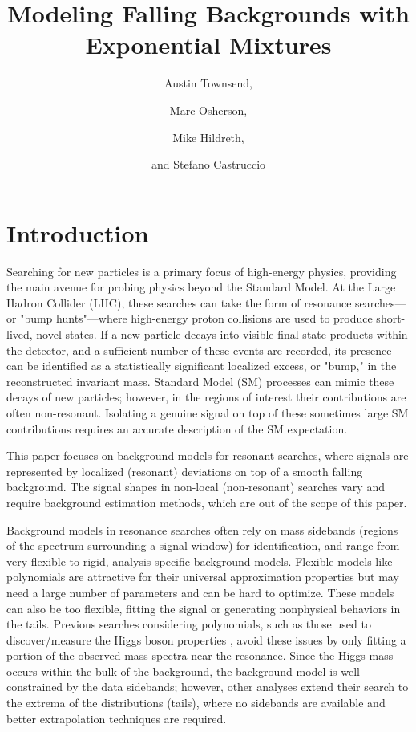 \documentclass[a4paper,11pt]{article}
\title{Modeling Falling Backgrounds with Exponential Mixtures}
\author[1]{Austin Townsend,}
\author[1]{Marc Osherson,}
\author[1]{Mike Hildreth, }
\author[1]{and Stefano Castruccio}
\affiliation[1]{University of Notre Dame,\\
USA}
\begin{document}
\maketitle
\flushbottom

\section{Introduction}
\label{sec:intro}

Searching for new particles is a primary focus of high-energy physics, providing the main avenue for probing physics beyond the Standard Model. At the Large Hadron Collider (LHC), these searches can take the form of resonance searches—or "bump hunts"—where high-energy proton collisions are used to produce short-lived, novel states. If a new particle decays into visible final-state products within the detector, and a sufficient number of these events are recorded, its presence can be identified as a statistically significant localized excess, or "bump," in the reconstructed invariant mass. Standard Model (SM) processes can mimic these decays of new particles; however, in the regions of interest their contributions are often non-resonant. Isolating a genuine signal on top of these sometimes large SM contributions requires an accurate description of the SM expectation.

This paper focuses on background models for resonant searches, where signals are 
represented by localized (resonant) deviations on top of a smooth falling background. The signal 
shapes in non-local (non-resonant) searches vary and require background estimation methods, which 
are out of the scope of this paper.

Background models in resonance searches often rely on mass sidebands (regions 
of the spectrum surrounding a signal window) for identification, and range from 
very flexible to rigid, analysis-specific background models. Flexible models like polynomials are attractive for their universal approximation properties but may need a large number of parameters and can 
be hard to optimize. These models can also be too flexible, fitting the signal or generating nonphysical behaviors in the tails. Previous searches considering polynomials, 
such as those used to discover/measure the Higgs boson properties \cite{CMS_Higgs_Discovery, Aad_2014}, avoid these issues by only fitting a portion of the observed mass spectra near the resonance. Since the Higgs mass 
occurs within the bulk of the background, the background model is well constrained by the data 
sidebands; however, other analyses extend their search to the extrema of the distributions (tails), where no sidebands are 
available and better extrapolation techniques are required.
\end{document}
